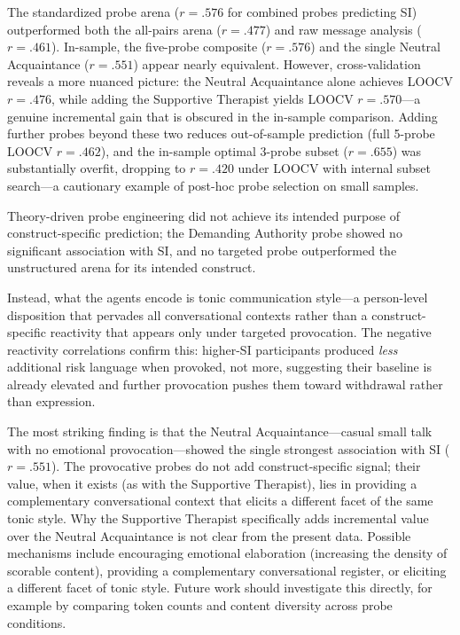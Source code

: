 \documentclass[review,12pt,authoryear]{elsarticle}
\begin{document}
The standardized probe arena ($r = .576$ for combined probes predicting SI) outperformed both the all-pairs arena ($r = .477$) and raw message analysis ($r = .461$). In-sample, the five-probe composite ($r = .576$) and the single Neutral Acquaintance ($r = .551$) appear nearly equivalent. However, cross-validation reveals a more nuanced picture: the Neutral Acquaintance alone achieves LOOCV $r = .476$, while adding the Supportive Therapist yields LOOCV $r = .570$---a genuine incremental gain that is obscured in the in-sample comparison. Adding further probes beyond these two reduces out-of-sample prediction (full 5-probe LOOCV $r = .462$), and the in-sample optimal 3-probe subset ($r = .655$) was substantially overfit, dropping to $r = .420$ under LOOCV with internal subset search---a cautionary example of post-hoc probe selection on small samples.

Theory-driven probe engineering did not achieve its intended purpose of construct-specific prediction; the Demanding Authority probe showed no significant association with SI, and no targeted probe outperformed the unstructured arena for its intended construct.

Instead, what the agents encode is tonic communication style---a person-level disposition that pervades all conversational contexts rather than a construct-specific reactivity that appears only under targeted provocation. The negative reactivity correlations confirm this: higher-SI participants produced \textit{less} additional risk language when provoked, not more, suggesting their baseline is already elevated and further provocation pushes them toward withdrawal rather than expression.

The most striking finding is that the Neutral Acquaintance---casual small talk with no emotional provocation---showed the single strongest association with SI ($r = .551$). The provocative probes do not add construct-specific signal; their value, when it exists (as with the Supportive Therapist), lies in providing a complementary conversational context that elicits a different facet of the same tonic style. Why the Supportive Therapist specifically adds incremental value over the Neutral Acquaintance is not clear from the present data. Possible mechanisms include encouraging emotional elaboration (increasing the density of scorable content), providing a complementary conversational register, or eliciting a different facet of tonic style. Future work should investigate this directly, for example by comparing token counts and content diversity across probe conditions.
\end{document}
